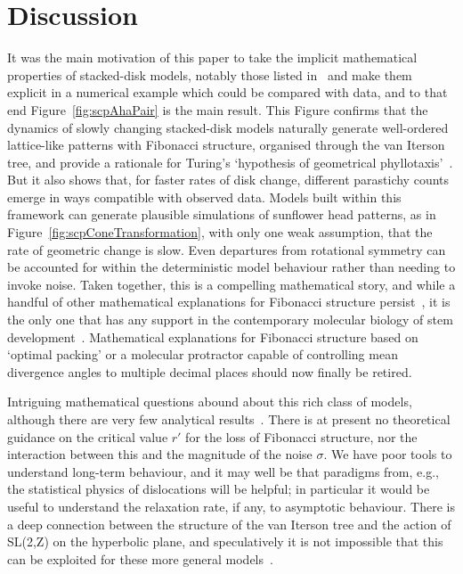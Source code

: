 \documentclass[a4paper,10pt]{amsart}
\begin{document}
\clearpage
\section{Discussion}
It was the main motivation of this paper to take the implicit mathematical properties of stacked-disk models, notably those listed in~\cite{goleFibonacciQuasisymmetricPhyllotaxis2016} and make them explicit in a numerical example which could be compared with data, and to that end Figure~\ref{fig:scpAhaPair} is the main result. This Figure confirms that the dynamics of slowly changing stacked-disk models naturally generate well-ordered lattice-like patterns with Fibonacci structure, organised through the van Iterson tree, and provide a rationale for Turing's `hypothesis of geometrical phyllotaxis'~\cite{turingMorphogenTheoryPhyllotaxis2013,swintonMathematicalPhyllotaxis2023}. But it also shows that, for faster rates of disk change, different parastichy counts emerge in ways compatible with observed data.  Models built within this framework can generate plausible simulations of sunflower head patterns, as in Figure~\ref{fig:scpConeTransformation}, with  only one weak assumption, that the rate of geometric change is slow.  Even departures from rotational symmetry can be accounted for within the deterministic model behaviour rather than needing to invoke noise.
Taken together, this is a compelling mathematical story, and while a handful of other mathematical explanations for Fibonacci structure persist~\cite{okabeUnifiedRulePhyllotaxis2019}, it is the only one that has any support in the contemporary molecular biology of stem development~\cite{swintonMathematicalPhyllotaxis2023}. Mathematical explanations for Fibonacci structure based on `optimal packing' or a molecular protractor capable of controlling mean divergence angles to multiple decimal places should now finally be retired.



Intriguing mathematical questions abound about this rich class of models, although there are very few analytical results~\cite{goleConvergenceDiskStacking2020}. There is at present no theoretical guidance on the critical value $r'$ for the loss of Fibonacci structure, nor the interaction between this and the magnitude of the noise $\sigma$.  We have poor tools to understand  long-term behaviour, and it may well be that paradigms from, e.g., the statistical physics of dislocations will be helpful; in  particular it would be useful to understand the relaxation rate, if any, to asymptotic behaviour.  There is a deep connection between the structure of the van Iterson tree and the action of SL(2,Z) on the hyperbolic plane, and speculatively it is not impossible that this can be exploited for these more general models~\cite{swintonTextbookMathematicalPhyllotaxis2022}.  
\end{document}
